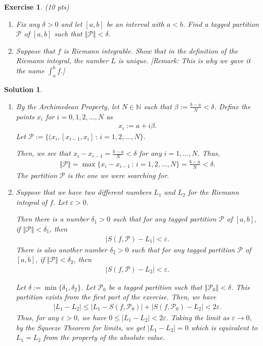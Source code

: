 \documentclass[12pt]{article}
\newcommand{\bN}{\mathbb{N}}
\newcommand{\cP}{\mathcal{P}}
\newcommand{\ra}{\rightarrow}
\theoremstyle{plain}
\newtheorem{exer}{\textbf{Exercise}}}
\theoremstyle{plain}
\newtheorem*{sol}{\textbf{Solution}}}
\theoremstyle{plain}
\theoremstyle{plain}
\begin{document}
\begin{exer}
(10 pts)
\begin{enumerate}[label=\textbf{\alph*)}]
\item Fix any $\delta > 0$ and let $[a, b]$ be an interval with $a < b$. Find a tagged partition $\cP$ of $[a, b]$ such that $\Vert \cP \Vert < \delta$.
\item Suppose that $f$ is Riemann integrable. Show that in the definition of the Riemann integral, the number $L$ is unique. [Remark: This is why we gave it the name $\int_a^b f$.]
\end{enumerate}
\end{exer}
\begin{sol}
\begin{enumerate}[label=\textbf{\alph*)}]
\item By the Archimedean Property, let $N \in \bN$ such that $\beta := \frac{b - a}{N} < \delta$. Define the points $x_i$ for $i = 0, 1, 2, \ldots , N$ as
	\begin{align*}
	x_i := a + i \beta .
	\end{align*}
Let $\cP := \{ (x_i , [x_{i - 1} , x_i ] \, : \, i = 1 , 2, \ldots , N \}$. 

Then, we see that $x_i - x_{i-1} = \frac{b - a}{N} < \delta$ for any $i = 1 , \ldots , N$. Thus, 
	\begin{align*}
	\Vert \cP \Vert = \max \{ x_i - x_{i-1} \, : \, i = 1 , 2, \ldots , N \} = \frac{b - a}{N} < \delta.
	\end{align*}
	The partition $\cP$ is the one we were searching for.
\item Suppose that we have two different numbers $L_1$ and $L_2$ for the Riemann integral of $f$. Let $\varepsilon > 0$. 

Then there is a number $\delta_1 > 0$ such that for any tagged partition $\cP$ of $[a, b]$, if $\Vert \cP \Vert < \delta_1$, then
	\begin{align*}
	| S (f , \cP ) - L_1 | < \varepsilon .
	\end{align*}
There is also another number $\delta_2 > 0$ such that for any tagged partition $\cP$ of $[a, b]$, if $\Vert \cP \Vert < \delta_2$, then
	\begin{align*}
	| S (f, \cP ) - L_2 | < \varepsilon .
	\end{align*}

Let $\delta := \min \{ \delta_1 , \delta_2 \}$. Let $\cP_0$ be a tagged partition such that $\Vert \cP_0 \Vert < \delta$. This partition exists from the first part of the exercise. Then, we have
	\begin{align*}
	| L_1 - L_2 | \leq |L_1 - S (f , \cP_0 ) | + | S (f , \cP_0 ) - L_2 | < 2 \varepsilon .
	\end{align*}
Thus, for any $\varepsilon > 0$, we have $0 \leq |L_1 - L_2 | < 2 \varepsilon$. Taking the limit as $\varepsilon \ra 0$, by the Squeeze Theorem for limits, we get $|L_1 - L_2| = 0$ which is equivalent to $L_1 = L_2$ from the property of the absolute value.
\end{enumerate}
\end{sol}
\end{document}
